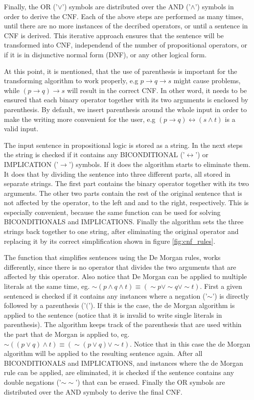 \documentclass[a4paper,10pt]{article}
\begin{document}
Finally, the OR ('$\vee$') symbols are distributed over the AND ('$\wedge$') symbols in order to derive the CNF. Each of the above steps are performed as many times, until there are no more instances of the decribed operators, or until a sentence in CNF is derived. This iterative approach ensures that the sentence will be transformed into CNF, independend of the number of propositional operators, or if it is in disjunctive normal form (DNF), or any other logical form.

At this point, it is mentioned, that the use of parenthesis is important for the transforming algorithm to work properly, e.g $p\rightarrow q\rightarrow s$ might cause problems, while $(p\rightarrow q)\rightarrow s$ will result in the correct CNF. In other word, it needs to be ensured that each binary operator together with its two arguments is enclosed by parenthesis. By default, we insert parenthesis around the whole input in order to make the writing more convenient for the user, e.g $(p\rightarrow q)\leftrightarrow (s\wedge t)$ is a valid input.

The input sentence in propositional logic is stored as a string. In the next steps the string is checked if it contains any BICONDITIONAL ('$\leftrightarrow$') or IMPLICATION ('$\rightarrow$') symbols. If it does the algorithm starts to eliminate them. It does that by dividing the sentence into three different parts, all stored in separate strings. The first part contains the binary operator together with its two arguments. The other two parts contain the rest of the original sentence that is not affected by the operator, to the left and and to the right, respectively. This is especially convenient, because the same function can be used for solving BICONDITIONALS and IMPLICATIONS. Finally the algorithm sets the three strings back together to one string, after eliminating the original operator and replacing it by its correct simplification shown in figure \ref{fig:cnf_rules}.

The function that simplifies sentences using the De Morgan rules, works differently, since there is no operator that divides the two arguments that are affected by this operator. Also notice that De Morgan can be applied to multiple literals at the same time, eg. $\sim(p\wedge q\wedge t) \equiv (\sim p\vee\sim q\vee\sim t)$. First a given sentenced is checked if it contains any instances where a negation ('$\sim$') is directly followed by a parenthesis ('$($'). If this is the case, the de Morgan algorithm is applied to the sentence (notice that it is invalid to write single literals in parenthesis). The algorithm keeps track of the parenthesis that are used within the part that de Morgan is applied to, eg. $\sim((p\vee q)\wedge t) \equiv (\sim(p\vee q)\vee\sim t)$. Notice that in this case the de Morgan algorithm will be applied to the resulting sentence again. After all BICONDITIONALS and IMPLICATIONS, and instances where the de Morgan rule can be applied, are eliminated, it is checked if the sentence contains any double negations ('$\sim\sim$') that can be erased. Finally the OR symbols are distributed over the AND symboly to derive the final CNF.
\end{document}
